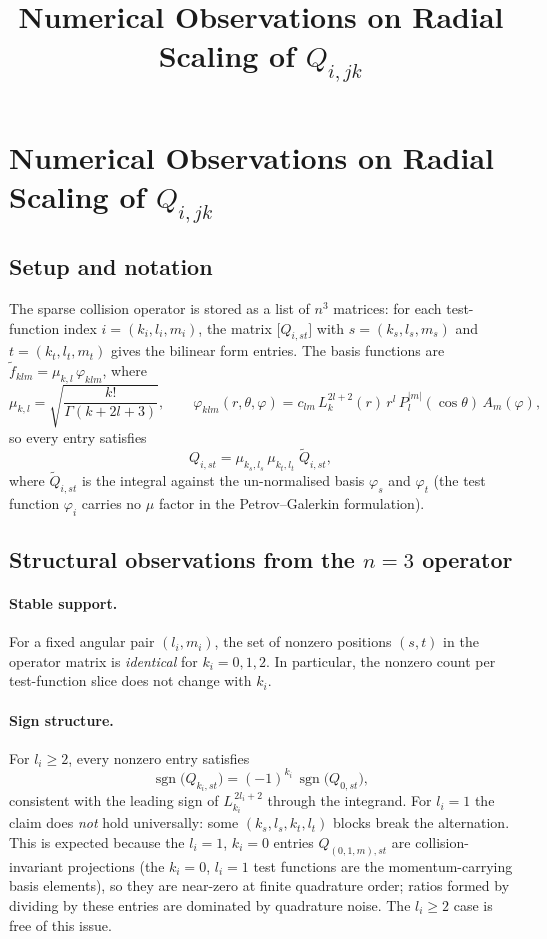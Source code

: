 \documentclass{article}
\title{Numerical Observations on Radial Scaling of $Q_{i,jk}$}
\date{}
\begin{document}
\maketitle


\section*{Numerical Observations on Radial Scaling of $Q_{i,jk}$}

\subsection*{Setup and notation}

The sparse collision operator is stored as a list of $n^3$ matrices:
for each test-function index $i = (k_i, l_i, m_i)$, the matrix
$\bigl[Q_{i,st}\bigr]$ with $s = (k_s, l_s, m_s)$ and $t = (k_t, l_t, m_t)$
gives the bilinear form entries.
The basis functions are $\tilde{f}_{klm} = \mu_{k,l}\,\varphi_{klm}$, where
\[
  \mu_{k,l} = \sqrt{\frac{k!}{\Gamma(k+2l+3)}},
  \qquad
  \varphi_{klm}(r,\theta,\varphi)
    = c_{lm}\,L_k^{2l+2}(r)\,r^l\,P_l^{|m|}(\cos\theta)\,A_m(\varphi),
\]
so every entry satisfies
\[
  Q_{i,st} = \mu_{k_s,l_s}\,\mu_{k_t,l_t}\;\tilde{Q}_{i,st},
\]
where $\tilde{Q}_{i,st}$ is the integral against the un-normalised basis
$\varphi_s$ and $\varphi_t$ (the test function $\varphi_i$ carries no $\mu$
factor in the Petrov--Galerkin formulation).

\subsection*{Structural observations from the $n=3$ operator}

\paragraph{Stable support.}
For a fixed angular pair $(l_i,m_i)$, the set of nonzero positions $(s,t)$
in the operator matrix is \emph{identical} for $k_i = 0,1,2$.
In particular, the nonzero count per test-function slice does not change
with $k_i$.

\paragraph{Sign structure.}
For $l_i \geq 2$, every nonzero entry satisfies
\[
  \operatorname{sgn}\bigl(Q_{k_i,st}\bigr) = (-1)^{k_i}\,\operatorname{sgn}\bigl(Q_{0,st}\bigr),
\]
consistent with the leading sign of $L_{k_i}^{\,2l_i+2}$ through the integrand.
For $l_i = 1$ the claim does \emph{not} hold universally: some
$(k_s,l_s,k_t,l_t)$ blocks break the alternation.
This is expected because the $l_i=1$, $k_i=0$ entries
$Q_{(0,1,m),st}$ are collision-invariant projections (the $k_i=0$, $l_i=1$
test functions are the momentum-carrying basis elements), so they are
near-zero at finite quadrature order; ratios formed by dividing by these
entries are dominated by quadrature noise.
The $l_i \geq 2$ case is free of this issue.
\end{document}
